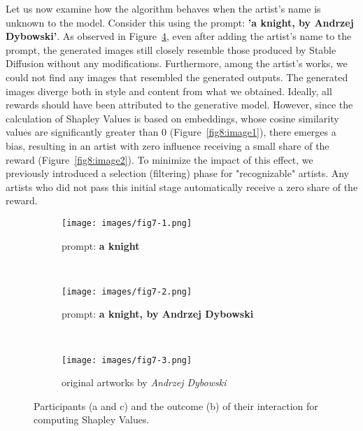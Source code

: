 \documentclass[12pt, letterpaper]{article}
\begin{document}
Let us now examine how the algorithm behaves when the artist's name is unknown to the model. Consider this using the prompt: \textbf{'a knight, by Andrzej Dybowski'}. As observed in Figure~\ref{fig7:stacked_images}, even after adding the artist's name to the prompt, the generated images still closely resemble those produced by Stable Diffusion without any modifications. Furthermore, among the artist's works, we could not find any images that resembled the generated outputs. The generated images diverge both in style and content from what we obtained. Ideally, all rewards should have been attributed to the generative model. However, since the calculation of Shapley Values is based on embeddings, whose cosine similarity values are significantly greater than 0 (Figure~\ref{fig8:image1}), there emerges a bias, resulting in an artist with zero influence receiving a small share of the reward (Figure~\ref{fig8:image2}). To minimize the impact of this effect, we previously introduced a selection (filtering) phase for "recognizable" artists. Any artists who did not pass this initial stage automatically receive a zero share of the reward.

\begin{figure}[h]
    \centering
    
    \begin{subfigure}{\textwidth}
        \centering
        \texttt{[image: images/fig7-1.png]}
        \caption{prompt: \textbf{a knight}}
        \label{fig7:sub1}
    \end{subfigure}
    \\
    
    \begin{subfigure}{\textwidth}
        \centering
        \texttt{[image: images/fig7-2.png]}
        \caption{prompt: \textbf{a knight,  by Andrzej Dybowski}}
        \label{fig7:sub2}
    \end{subfigure}
    \\
   
    \begin{subfigure}{\textwidth}
        \centering
        \texttt{[image: images/fig7-3.png]}
        \caption{original artworks by \textit{Andrzej Dybowski}}
        \label{fig7:sub3}
    \end{subfigure}    

    \caption{Participants (a and c) and the outcome (b) of their interaction for computing Shapley Values.}
    \label{fig7:stacked_images}
\end{figure}
\end{document}
